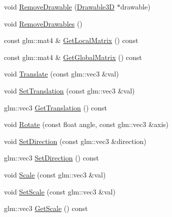 \begin{DoxyCompactItemize}
\item 
void \mbox{\hyperlink{classngl_1_1_node_a801c678246ad88f5d33ae9c47ede2992}{Remove\+Drawable}} (\mbox{\hyperlink{classngl_1_1_drawable3_d}{Drawable3D}} $\ast$drawable)
\item 
void \mbox{\hyperlink{classngl_1_1_node_a70d51bc5f36073762f0ce8ec262a9307}{Remove\+Drawables}} ()
\item 
const glm\+::mat4 \& \mbox{\hyperlink{classngl_1_1_node_aeb627cd66b16eb807282b6b551980770}{Get\+Local\+Matrix}} () const
\item 
const glm\+::mat4 \& \mbox{\hyperlink{classngl_1_1_node_a7231849fbd4fea52a90c4c30dd1c6f36}{Get\+Global\+Matrix}} () const
\item 
void \mbox{\hyperlink{classngl_1_1_node_a91568b750a8b03b4bc395ae1b0eff15a}{Translate}} (const glm\+::vec3 \&val)
\item 
void \mbox{\hyperlink{classngl_1_1_node_a773a04ee8b7e7a561ef4f3a00724722f}{Set\+Translation}} (const glm\+::vec3 \&val)
\item 
glm\+::vec3 \mbox{\hyperlink{classngl_1_1_node_a1d6174ab5ec4b47c685b392c08eee705}{Get\+Translation}} () const
\item 
void \mbox{\hyperlink{classngl_1_1_node_ad5124f13d41ab70817eca9e3f12a8c49}{Rotate}} (const float angle, const glm\+::vec3 \&axis)
\item 
void \mbox{\hyperlink{classngl_1_1_node_ac7c309854edb060f9f9202d611b8c679}{Set\+Direction}} (const glm\+::vec3 \&direction)
\item 
glm\+::vec3 \mbox{\hyperlink{classngl_1_1_node_a11f0d525560597d50917a2ef9180af47}{Set\+Direction}} () const
\item 
void \mbox{\hyperlink{classngl_1_1_node_adde3d3a0d6dcd5f9a161898c2554af36}{Scale}} (const glm\+::vec3 \&val)
\item 
void \mbox{\hyperlink{classngl_1_1_node_a56f4c2df8dc53845c513c3dfeb025e18}{Set\+Scale}} (const glm\+::vec3 \&val)
\item 
glm\+::vec3 \mbox{\hyperlink{classngl_1_1_node_a1afed96e8fae1a836c84b3ddfe61632a}{Get\+Scale}} () const
\end{DoxyCompactItemize}
